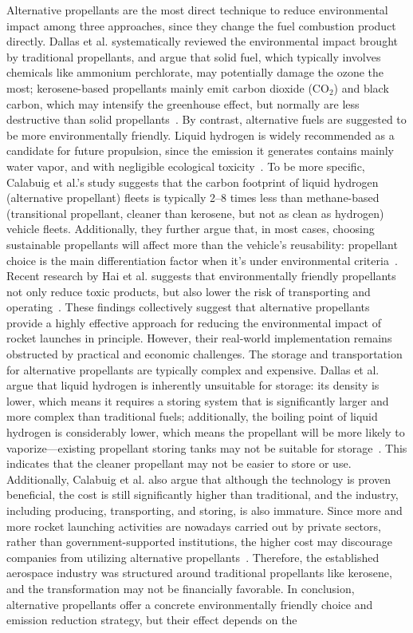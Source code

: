 \documentclass[12pt]{article}
\begin{document}
Alternative propellants are the most direct technique to reduce environmental impact among three approaches, since they change the fuel combustion product directly. Dallas et al. systematically reviewed the environmental impact brought by traditional propellants, and argue that solid fuel, which typically involves chemicals like ammonium perchlorate, may potentially damage the ozone the most; kerosene-based propellants mainly emit carbon dioxide (CO$_2$) and black carbon, which may intensify the greenhouse effect, but normally are less destructive than solid propellants~\citep{dallas2020review,brown2024inventory}. By contrast, alternative fuels are suggested to be more environmentally friendly. Liquid hydrogen is widely recommended as a candidate for future propulsion, since the emission it generates contains mainly water vapor, and with negligible ecological toxicity~\citep{dallas2020review,barato2023fuels}. To be more specific, Calabuig et al.'s study suggests that the carbon footprint of liquid hydrogen (alternative propellant) fleets is typically 2--8 times less than methane-based (transitional propellant, cleaner than kerosene, but not as clean as hydrogen) vehicle fleets. Additionally, they further argue that, in most cases, choosing sustainable propellants will affect more than the vehicle's reusability: propellant choice is the main differentiation factor when it's under environmental criteria~\citep{calabuig2024reusable}. Recent research by Hai et al. suggests that environmentally friendly propellants not only reduce toxic products, but also lower the risk of transporting and operating~\citep{hai2026propellants}. These findings collectively suggest that alternative propellants provide a highly effective approach for reducing the environmental impact of rocket launches in principle. However, their real-world implementation remains obstructed by practical and economic challenges. The storage and transportation for alternative propellants are typically complex and expensive. Dallas et al. argue that liquid hydrogen is inherently unsuitable for storage: its density is lower, which means it requires a storing system that is significantly larger and more complex than traditional fuels; additionally, the boiling point of liquid hydrogen is considerably lower, which means the propellant will be more likely to vaporize---existing propellant storing tanks may not be suitable for storage~\citep{dallas2020review}. This indicates that the cleaner propellant may not be easier to store or use. Additionally, Calabuig et al. also argue that although the technology is proven beneficial, the cost is still significantly higher than traditional, and the industry, including producing, transporting, and storing, is also immature. Since more and more rocket launching activities are nowadays carried out by private sectors, rather than government-supported institutions, the higher cost may discourage companies from utilizing alternative propellants~\citep{calabuig2024reusable}. Therefore, the established aerospace industry was structured around traditional propellants like kerosene, and the transformation may not be financially favorable. In conclusion, alternative propellants offer a concrete environmentally friendly choice and emission reduction strategy, but their effect depends on the 
\end{document}
